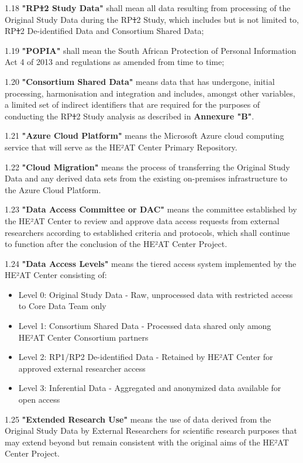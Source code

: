\documentclass[12pt,letterpaper]{article}
\newcommand{\deleted}[1]{\textcolor{deletecolor}{\sout{#1}}}
\newcommand{\added}[1]{\textcolor{addcolor}{#1}}
\begin{document}
1.18 \textbf{"RP\deleted{1}\added{2} Study Data"} shall mean all data resulting from processing of the Original Study Data during the RP\deleted{1}\added{2} Study, which includes but is not limited to, RP\deleted{1}\added{2} De-identified Data and Consortium Shared Data;

1.19 \textbf{"POPIA"} shall mean the South African Protection of Personal Information Act 4 of 2013 and regulations as amended from time to time;

1.20 \textbf{"Consortium Shared Data"} means data that has undergone, initial processing, harmonisation and integration and includes, amongst other variables, a limited set of indirect identifiers that are required for the purposes of conducting the RP\deleted{1}\added{2} Study analysis as described in \textbf{Annexure "B"}.

\added{1.21 \textbf{"Azure Cloud Platform"} means the Microsoft Azure cloud computing service that will serve as the HE²AT Center Primary Repository.}

\added{1.22 \textbf{"Cloud Migration"} means the process of transferring the Original Study Data and any derived data sets from the existing on-premises infrastructure to the Azure Cloud Platform.}

\added{1.23 \textbf{"Data Access Committee or DAC"} means the committee established by the HE²AT Center to review and approve data access requests from external researchers according to established criteria and protocols, which shall continue to function after the conclusion of the HE²AT Center Project.}

\added{1.24 \textbf{"Data Access Levels"} means the tiered access system implemented by the HE²AT Center consisting of:
\begin{itemize}
   \item Level 0: Original Study Data - Raw, unprocessed data with restricted access to Core Data Team only
   \item Level 1: Consortium Shared Data - Processed data shared only among HE²AT Center Consortium partners
   \item Level 2: RP1/RP2 De-identified Data - Retained by HE²AT Center for approved external researcher access
   \item Level 3: Inferential Data - Aggregated and anonymized data available for open access
\end{itemize}}

\added{1.25 \textbf{"Extended Research Use"} means the use of data derived from the Original Study Data by External Researchers for scientific research purposes that may extend beyond but remain consistent with the original aims of the HE²AT Center Project.}
\end{document}
